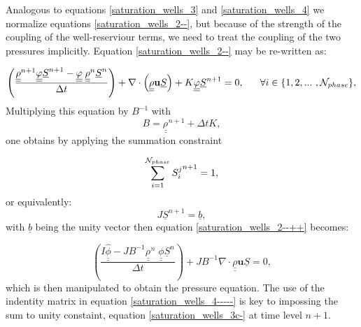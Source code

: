 Analogous to equations \ref{saturation_wells_3} and \ref{saturation_wells_4} we normalize equations 
\ref{saturation_wells_2--},  
but because of the strength of the coupling of the well-reserviour terms, we need to 
treat the coupling of the two pressures implicitly. Equation \ref{saturation_wells_2--} may be re-written 
as:

\begin{equation}\displaystyle
  \left( \frac{  
 \underline{\underline{\rho}}^{n+1}\underline{\underline \phi} {\underline S}^{n+1} - \underline{\underline\phi} \; \underline{\underline{\rho}}^{n}   {\underline S}^n
}{\Delta t} \right) + \nabla\cdot\left( \underline{\underline\rho} \mathbf{u} {\underline{S}} \right) +  K\underline{\underline \phi} \underline{S}^{n+1}= 0, 
~~~~~ \forall i \in\{ 1,2,...~ , {\cal N}_{phase}\},
\label{saturation_wells_2--++}
\end{equation}
Multiplying this equation by $B^{-1}$ with
\begin{equation}
B= \underline{\underline{\rho^{}}}^{n+1} +\Delta t K, 
\label{saturation_wells_2--++--}
\end{equation}
one obtains by 
applying the summation constraint 

\begin{equation}
\sum\limits_{i=1}^{{\cal N}_{phase}} 
{S_i^{j}}^{n+1}
= 1,
\label{saturation_wells_3c-}
\end{equation}  
or equivalently: 
\begin{equation}
 J 
\underline{S}^{n+1}
= \underline{b},
\label{saturation_wells_3c-b}
\end{equation}  
with $\underline{b}$ being the unity vector then 
equation 
\ref{saturation_wells_2--++} becomes: 

\begin{equation}
\left(  \frac{  
I \hat{ \underline{\underline \phi} }
-  
J
B^{-1} \underline{\underline{\rho^{}}}^{n} \; \underline{\underline \phi}
\underline{S}^n
}
{\Delta t}
\right) 
+ 
J 
B^{-1} 
\nabla\cdot \underline{\underline\rho} \mathbf{u} {\underline S}
= 0, 
\label{saturation_wells_4-----}
\end{equation}
which is then manipulated to obtain the pressure equation. 
The use of the indentity matrix in equation \ref{saturation_wells_4-----} 
is key to impossing the sum to unity constaint, equation \ref{saturation_wells_3c-} 
at time level $n+1$.



